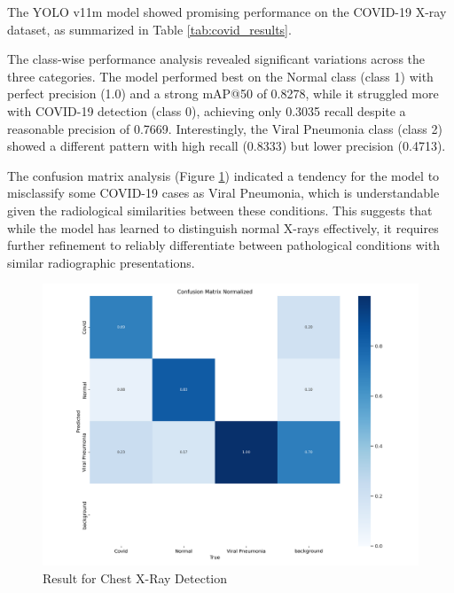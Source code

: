 \begin{multicols}{2}
The YOLO v11m model showed promising performance on the COVID-19 X-ray dataset, as summarized in Table \ref{tab:covid_results}.

The class-wise performance analysis revealed significant variations across the three categories. The model performed best on the Normal class (class 1) with perfect precision (1.0) and a strong mAP@50 of 0.8278, while it struggled more with COVID-19 detection (class 0), achieving only 0.3035 recall despite a reasonable precision of 0.7669. Interestingly, the Viral Pneumonia class (class 2) showed a different pattern with high recall (0.8333) but lower precision (0.4713).
\end{multicols}

\begin{multicols}{2}
The confusion matrix analysis (Figure \ref{fig:covid_confusion}) indicated a tendency for the model to misclassify some COVID-19 cases as Viral Pneumonia, which is understandable given the radiological similarities between these conditions. This suggests that while the model has learned to distinguish normal X-rays effectively, it requires further refinement to reliably differentiate between pathological conditions with similar radiographic presentations.
\end{multicols}

\vspace{0.5in}

\begin{figure}[ht]
    \centering
    \includegraphics[width=1\textwidth]{datas/x_ray_summary_datas/x_ray_confusion_matrix_normalized.png}
    \caption{Result for Chest X-Ray Detection}
    \label{fig:covid_confusion}
\end{figure}

